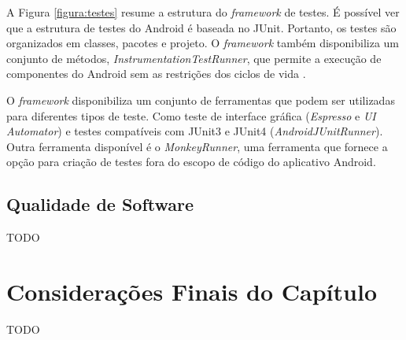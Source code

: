 A Figura \ref{figura:testes} resume a estrutura do \textit{framework} de testes. É possível ver que a estrutura de testes do Android é baseada no JUnit. Portanto, os testes são organizados em classes, pacotes e projeto. O \textit{framework} também disponibiliza um conjunto de métodos, \textit{InstrumentationTestRunner}, que permite a execução de componentes do Android sem as restrições dos ciclos de vida \cite{androidTesting2015}.

O \textit{framework} disponibiliza um conjunto de ferramentas que podem ser utilizadas para diferentes tipos de teste. Como teste de interface gráfica (\textit{Espresso} e \textit{UI Automator}) e testes compatíveis com JUnit3 e JUnit4 (\textit{AndroidJUnitRunner}). Outra ferramenta disponível é o \textit{MonkeyRunner}, uma ferramenta que fornece a opção para criação de testes fora do escopo de código do aplicativo Android.




  \subsection{Qualidade de Software}

TODO

\section{Considerações Finais do Capítulo}

TODO
